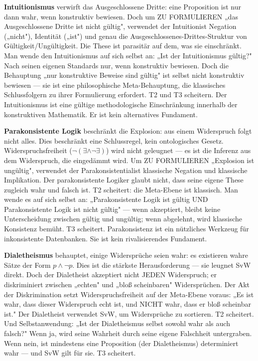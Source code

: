 \documentclass[10pt, openany, oneside]{book}
\begin{document}
\textbf{Intuitionismus} verwirft das Ausgeschlossene Dritte: eine Proposition ist nur dann wahr, wenn konstruktiv bewiesen. Doch um ZU FORMULIEREN „das Ausgeschlossene Dritte ist nicht gültig", verwendet der Intuitionist Negation („nicht"), Identität („ist") und genau die Ausgeschlossenes-Drittes-Struktur von Gültigkeit/Ungültigkeit. Die These ist parasitär auf dem, was sie einschränkt. Man wende den Intuitionismus auf sich selbst an: „Ist der Intuitionismus gültig?" Nach seinen eigenen Standards nur, wenn konstruktiv bewiesen. Doch die Behauptung „nur konstruktive Beweise sind gültig" ist selbst nicht konstruktiv bewiesen --- sie ist eine philosophische Meta-Behauptung, die klassisches Schlussfolgern zu ihrer Formulierung erfordert. T2 und T3 scheitern. Der Intuitionismus ist eine gültige methodologische Einschränkung innerhalb der konstruktiven Mathematik. Er ist kein alternatives Fundament.

\textbf{Parakonsistente Logik} beschränkt die Explosion: aus einem Widerspruch folgt nicht alles. Dies beschränkt eine Schlussregel, kein ontologisches Gesetz. Widerspruchsfreiheit ($\neg(\exists \wedge \neg\exists)$) wird nicht geleugnet --- es ist die Inferenz aus dem Widerspruch, die eingedämmt wird. Um ZU FORMULIEREN „Explosion ist ungültig", verwendet der Parakonsistentialist klassische Negation und klassische Implikation. Der parakonsistente Logiker glaubt nicht, dass seine eigene These zugleich wahr und falsch ist. T2 scheitert: die Meta-Ebene ist klassisch. Man wende es auf sich selbst an: „Parakonsistente Logik ist gültig UND Parakonsistente Logik ist nicht gültig" --- wenn akzeptiert, bleibt keine Unterscheidung zwischen gültig und ungültig; wenn abgelehnt, wird klassische Konsistenz bemüht. T3 scheitert. Parakonsistenz ist ein nützliches Werkzeug für inkonsistente Datenbanken. Sie ist kein rivalisierendes Fundament.

\textbf{Dialetheismus} behauptet, einige Widersprüche seien wahr: es existieren wahre Sätze der Form $p \wedge \neg p$. Dies ist die stärkste Herausforderung --- sie leugnet SvW direkt. Doch der Dialetheist akzeptiert nicht JEDEN Widerspruch; er diskriminiert zwischen „echten" und „bloß scheinbaren" Widersprüchen. Der Akt der Diskrimination setzt Widerspruchsfreiheit auf der Meta-Ebene voraus: „Es ist wahr, dass dieser Widerspruch echt ist, und NICHT wahr, dass er bloß scheinbar ist." Der Dialetheist verwendet SvW, um Widersprüche zu sortieren. T2 scheitert. Und Selbstanwendung: „Ist der Dialetheismus selbst sowohl wahr als auch falsch?" Wenn ja, wird seine Wahrheit durch seine eigene Falschheit untergraben. Wenn nein, ist mindestens eine Proposition (der Dialetheismus) determiniert wahr --- und SvW gilt für sie. T3 scheitert.
\end{document}
